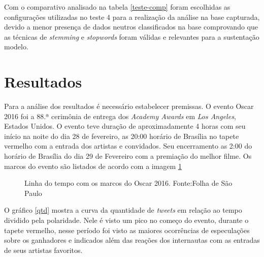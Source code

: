 \begin{table}[]		
	\caption{Comparando testes}
	\label{teste-comp}
\end{table}


Com o comparativo analisado na tabela \ref{teste-comp} foram escolhidas as configurações utilizadas no teste 4 para a realização da análise na base capturada, devido a menor presença de dados neutros classificados na base comprovando que as técnicas de \textit{stemming} e \textit{stopwords} foram válidas e relevantes para a sustentação modelo.

\section{Resultados}\label{result}

Para a análise dos resultados é necessário estabelecer premissas. O evento Oscar 2016 foi a  88.ª cerimônia de entrega dos \textit{Academy Awards} em \textit{Los Angeles}, Estados Unidos. O evento teve duração de aproximadamente 4 horas com seu início na noite do dia 28 de fevereiro, as 20:00 horário de Brasília no tapete vermelho com a entrada dos artistas e convidados. Seu encerramento as 2:00 do horário de Brasília do dia 29 de Fevereiro com a premiação do melhor filme. Os marcos do evento são listados de acordo com a imagem \ref{time}

\begin{figure}[!h]
	\centering{}
	\caption{Linha do tempo com os marcos do Oscar 2016. Fonte:Folha de São Paulo}
	\label{time}
\end{figure}
O gráfico \ref{qtd} mostra a curva da quantidade de \textit{tweets} em relação ao tempo  dividido pela polaridade. Nele é visto um pico  no começo do evento, durante o tapete vermelho, nesse período foi visto as maiores ocorrências de especulações sobre os ganhadores e indicados além das reações dos internautas com as entradas de seus artistas favoritos.

